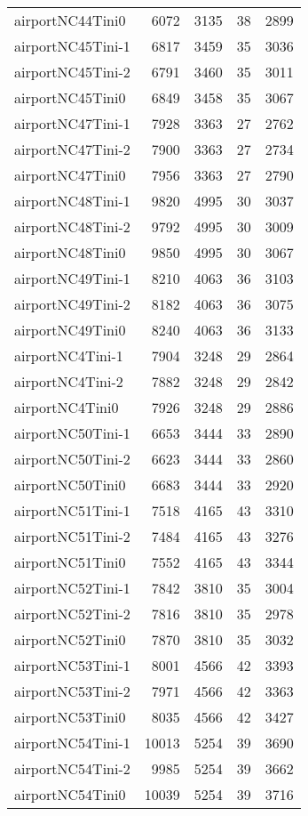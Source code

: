 \begin{longtable}{lrrrr}
airportNC44Tini0 & 6072 & 3135 & 38 & 2899 \\
airportNC45Tini-1 & 6817 & 3459 & 35 & 3036 \\
airportNC45Tini-2 & 6791 & 3460 & 35 & 3011 \\
airportNC45Tini0 & 6849 & 3458 & 35 & 3067 \\
airportNC47Tini-1 & 7928 & 3363 & 27 & 2762 \\
airportNC47Tini-2 & 7900 & 3363 & 27 & 2734 \\
airportNC47Tini0 & 7956 & 3363 & 27 & 2790 \\
airportNC48Tini-1 & 9820 & 4995 & 30 & 3037 \\
airportNC48Tini-2 & 9792 & 4995 & 30 & 3009 \\
airportNC48Tini0 & 9850 & 4995 & 30 & 3067 \\
airportNC49Tini-1 & 8210 & 4063 & 36 & 3103 \\
airportNC49Tini-2 & 8182 & 4063 & 36 & 3075 \\
airportNC49Tini0 & 8240 & 4063 & 36 & 3133 \\
airportNC4Tini-1 & 7904 & 3248 & 29 & 2864 \\
airportNC4Tini-2 & 7882 & 3248 & 29 & 2842 \\
airportNC4Tini0 & 7926 & 3248 & 29 & 2886 \\
airportNC50Tini-1 & 6653 & 3444 & 33 & 2890 \\
airportNC50Tini-2 & 6623 & 3444 & 33 & 2860 \\
airportNC50Tini0 & 6683 & 3444 & 33 & 2920 \\
airportNC51Tini-1 & 7518 & 4165 & 43 & 3310 \\
airportNC51Tini-2 & 7484 & 4165 & 43 & 3276 \\
airportNC51Tini0 & 7552 & 4165 & 43 & 3344 \\
airportNC52Tini-1 & 7842 & 3810 & 35 & 3004 \\
airportNC52Tini-2 & 7816 & 3810 & 35 & 2978 \\
airportNC52Tini0 & 7870 & 3810 & 35 & 3032 \\
airportNC53Tini-1 & 8001 & 4566 & 42 & 3393 \\
airportNC53Tini-2 & 7971 & 4566 & 42 & 3363 \\
airportNC53Tini0 & 8035 & 4566 & 42 & 3427 \\
airportNC54Tini-1 & 10013 & 5254 & 39 & 3690 \\
airportNC54Tini-2 & 9985 & 5254 & 39 & 3662 \\
airportNC54Tini0 & 10039 & 5254 & 39 & 3716 \\

\end{longtable}

